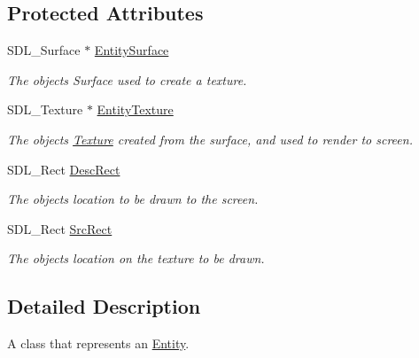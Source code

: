 \subsection*{Protected Attributes}
\begin{DoxyCompactItemize}
\item 
\hypertarget{class_entity_a195e44184fd33d919f727ae93c18b9de}{S\+D\+L\+\_\+\+Surface $\ast$ \hyperlink{class_entity_a195e44184fd33d919f727ae93c18b9de}{Entity\+Surface}}\label{class_entity_a195e44184fd33d919f727ae93c18b9de}

\begin{DoxyCompactList}\small\item\em The objects Surface used to create a texture. \end{DoxyCompactList}\item 
\hypertarget{class_entity_a2dc0bd74bf1e764381adf09f4e0ac7a2}{S\+D\+L\+\_\+\+Texture $\ast$ \hyperlink{class_entity_a2dc0bd74bf1e764381adf09f4e0ac7a2}{Entity\+Texture}}\label{class_entity_a2dc0bd74bf1e764381adf09f4e0ac7a2}

\begin{DoxyCompactList}\small\item\em The objects \hyperlink{class_texture}{Texture} created from the surface, and used to render to screen. \end{DoxyCompactList}\item 
\hypertarget{class_entity_a5ff9b78a02c0fe4eac20b438d92eaead}{S\+D\+L\+\_\+\+Rect \hyperlink{class_entity_a5ff9b78a02c0fe4eac20b438d92eaead}{Desc\+Rect}}\label{class_entity_a5ff9b78a02c0fe4eac20b438d92eaead}

\begin{DoxyCompactList}\small\item\em The objects location to be drawn to the screen. \end{DoxyCompactList}\item 
\hypertarget{class_entity_a0d63ab177666f7edae89c02f2e5e4e9e}{S\+D\+L\+\_\+\+Rect \hyperlink{class_entity_a0d63ab177666f7edae89c02f2e5e4e9e}{Src\+Rect}}\label{class_entity_a0d63ab177666f7edae89c02f2e5e4e9e}

\begin{DoxyCompactList}\small\item\em The objects location on the texture to be drawn. \end{DoxyCompactList}\end{DoxyCompactItemize}


\subsection{Detailed Description}
A class that represents an \hyperlink{class_entity}{Entity}. 

